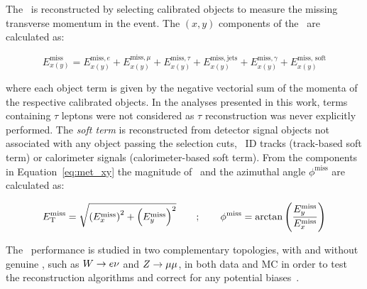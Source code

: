			The \met\ is reconstructed by selecting calibrated objects to measure the missing transverse momentum in the event. The $(x,y)$ components of the \met\ are calculated as: 

			\begin{equation}
				E_{x(y)}^{\mathrm{miss}} = E_{x(y)}^{\mathrm{miss}, e} + E_{x(y)}^{\mathrm{miss}, \mu} + E_{x(y)}^{\mathrm{miss}, \tau} + E_{x(y)}^{\mathrm{miss, jets}} + E_{x(y)}^{\mathrm{miss}, \gamma} + E_{x(y)}^{\mathrm{miss,\,soft}}
				\label{eq:met_xy}
			\end{equation}

			\noindent where each object term is given by the negative vectorial sum of the momenta of the respective calibrated objects. In the analyses presented in this work, terms containing $\tau$ leptons were not considered as $\tau$ reconstruction was never explicitly performed. The \emph{soft term} is reconstructed from detector signal objects not associated with any object passing the selection cuts, \eg\ \ac{ID} tracks (track-based soft term) or calorimeter signals (calorimeter-based soft term). From the components in Equation~\ref{eq:met_xy} the magnitude of \met\ and the azimuthal angle $\phi^{\mathrm{miss}}$ are calculated as:

			\begin{eqnarray}
				E_{\mathrm{T}}^{\mathrm{miss}} = \sqrt{ \left(E_{x}^{\mathrm{miss}}\right)^2 + \left(E_{y}^{\mathrm{miss}} \right)^2 } \qquad ; \qquad
				\phi^{\mathrm{miss}} = \arctan \left ( \frac{E_y^{\mathrm{miss}}}{E_x^{\mathrm{miss}}} \right )
			\end{eqnarray}

			The \met\ performance is studied in two complementary topologies, with and without genuine \met, such as $W \rightarrow e\nu$ and $Z \rightarrow \mu\mu$, in both data and \ac{MC} in order to test the reconstruction algorithms and correct for any potential biases~\cite{ATLASMet2015}. 

			